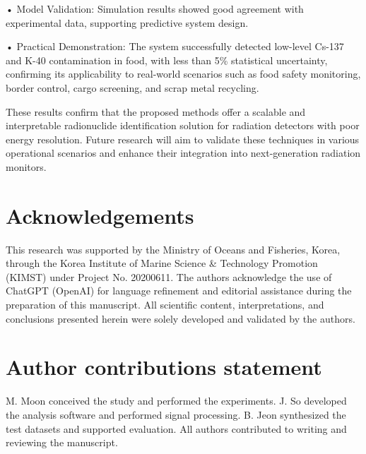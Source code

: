 \documentclass[10pt]{wlscirep}
\begin{document}
• Model Validation: Simulation results showed good agreement with experimental data, supporting predictive system design.

• Practical Demonstration: The system successfully detected low-level Cs-137 and K-40 contamination in food, with less than 5\% statistical uncertainty, confirming its applicability to real-world scenarios such as food safety monitoring, border control, cargo screening, and scrap metal recycling.

These results confirm that the proposed methods offer a scalable and interpretable radionuclide identification solution for radiation detectors with poor energy resolution. Future research will aim to validate these techniques in various operational scenarios and enhance their integration into next-generation radiation monitors.




\section*{Acknowledgements}

This research was supported by the Ministry of Oceans and Fisheries, Korea, through the Korea Institute of Marine Science \& Technology Promotion (KIMST) under Project No. 20200611. The authors acknowledge the use of ChatGPT (OpenAI) for language refinement and editorial assistance during the preparation of this manuscript. All scientific content, interpretations, and conclusions presented herein were solely developed and validated by the authors.

\section*{Author contributions statement}
M. Moon conceived the study and performed the experiments. J. So developed the analysis software and performed signal processing. B. Jeon synthesized the test datasets and supported evaluation. All authors contributed to writing and reviewing the manuscript.
\end{document}
